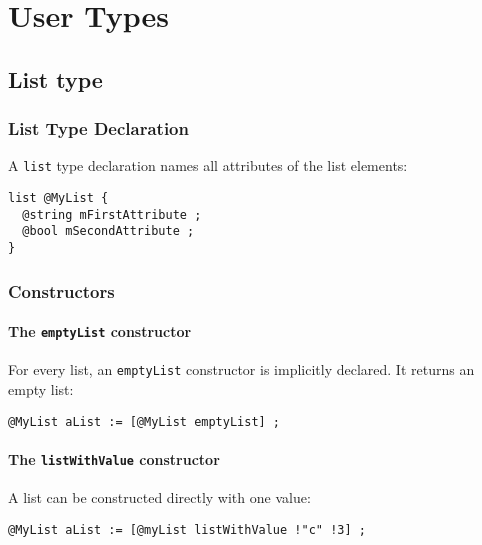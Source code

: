 
\chapter{User Types} \label{userTypes}


\section{List type}

\subsection{List Type Declaration}

A \lstinline[language=galgas]!list! type declaration names all attributes of the list elements:

\begin{lstlisting}[language=galgas]
list @MyList {
  @string mFirstAttribute ;
  @bool mSecondAttribute ;
}
\end{lstlisting}

\subsection{Constructors}

\subsubsection{The \lstinline[language=galgas]!emptyList! constructor}

For every list, an \lstinline[language=galgas]!emptyList! constructor is implicitly declared. It returns an empty list:

\begin{lstlisting}[language=galgas]
@MyList aList := [@MyList emptyList] ;
\end{lstlisting}


\subsubsection{The \lstinline[language=galgas]!listWithValue! constructor}

A list can be constructed directly with one value:

\begin{lstlisting}[language=galgas]
@MyList aList := [@myList listWithValue !"c" !3] ;
\end{lstlisting}


